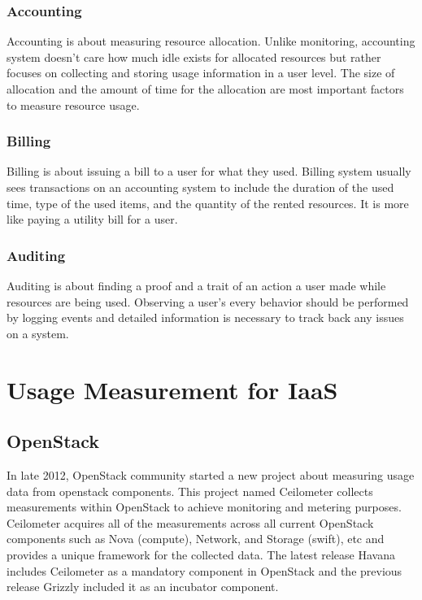 \documentclass{sig-alternate-05-2015}
\begin{document}
\subsubsection{Accounting}

Accounting is about measuring resource allocation. Unlike monitoring, accounting system doesn't care how much idle exists for allocated resources but rather focuses on collecting and storing usage information in a user level. The size of allocation and the amount of time for the allocation are most important factors to measure resource usage. 

\subsubsection{Billing}

Billing is about issuing a bill to a user for what they used. Billing system usually sees transactions on an accounting system to include the duration of the used time, type of the used items, and the quantity of the rented resources. It is more like paying a utility bill for a user. 

\subsubsection{Auditing}

Auditing is about finding a proof and a trait of an action a user made while resources are being used. Observing a user's every behavior should be performed by logging events and detailed information is necessary to track back any issues on a system. 

\section{Usage Measurement for IaaS}

\subsection{OpenStack}

In late 2012, OpenStack community started a new project about measuring usage data from openstack components. This project named Ceilometer collects measurements within OpenStack to achieve monitoring and metering purposes. Ceilometer acquires all of the measurements across all current OpenStack components such as Nova (compute), Network, and Storage (swift), etc and provides a unique framework for the collected data. The latest release Havana includes Ceilometer as a mandatory component in OpenStack and the previous release Grizzly included it as an incubator component.
\end{document}
